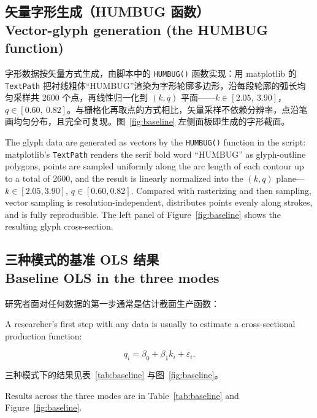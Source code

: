 \documentclass[12pt,a4paper]{ctexart}
\begin{document}
\subsection[矢量字形生成]{矢量字形生成（HUMBUG 函数）\\[1pt]\normalsize Vector-glyph generation (the HUMBUG function)}

字形数据按矢量方式生成，由脚本中的 \texttt{HUMBUG()} 函数实现：用 matplotlib 的 \texttt{TextPath} 把衬线粗体“HUMBUG”渲染为字形轮廓多边形，沿每段轮廓的弧长均匀采样共 2600 个点，再线性归一化到 $(k, q)$ 平面——$k \in [2.05,\ 3.90]$，$q \in [0.60,\ 0.82]$。与栅格化再取点的方式相比，矢量采样不依赖分辨率，点沿笔画均匀分布，且完全可复现。图~\ref{fig:baseline} 左侧面板即生成的字形截面。

The glyph data are generated as vectors by the \texttt{HUMBUG()} function in the script: matplotlib's \texttt{TextPath} renders the serif bold word “HUMBUG” as glyph-outline polygons, points are sampled uniformly along the arc length of each contour up to a total of 2600, and the result is linearly normalized into the $(k,q)$ plane—$k\in[2.05,3.90]$, $q\in[0.60,0.82]$. Compared with rasterizing and then sampling, vector sampling is resolution-independent, distributes points evenly along strokes, and is fully reproducible. The left panel of Figure~\ref{fig:baseline} shows the resulting glyph cross-section.

\subsection[三种模式的基准 OLS]{三种模式的基准 OLS 结果\\[1pt]\normalsize Baseline OLS in the three modes}

研究者面对任何数据的第一步通常是估计截面生产函数：

A researcher's first step with any data is usually to estimate a cross-sectional production function:

\begin{equation}\label{eq:baseline}
q_i = \beta_0 + \beta_1 k_i + \varepsilon_i .
\end{equation}

三种模式下的结果见表~\ref{tab:baseline} 与图~\ref{fig:baseline}。

Results across the three modes are in Table~\ref{tab:baseline} and Figure~\ref{fig:baseline}.
\end{document}
